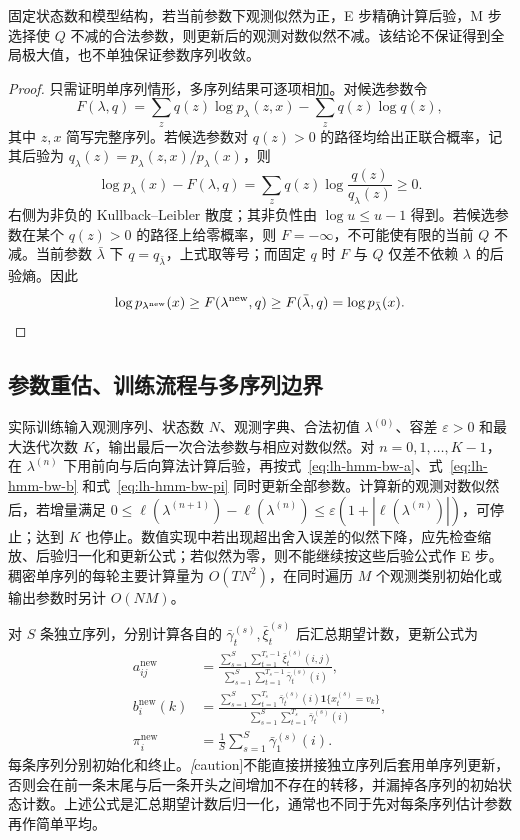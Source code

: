 \begin{proposition}
\label{prop:lh-hmm-em-monotone}
固定状态数和模型结构，若当前参数下观测似然为正，E 步精确计算后验，M 步选择使 $Q$ 不减的合法参数，则更新后的观测对数似然不减。该结论不保证得到全局极大值，也不单独保证参数序列收敛。
\end{proposition}
\begin{proof}
只需证明单序列情形，多序列结果可逐项相加。对候选参数令
\[
 F(\lambda,q)=\sum_z q(z)\log p_\lambda(z,x)-\sum_zq(z)\log q(z),
\]
其中 $z,x$ 简写完整序列。若候选参数对 $q(z)>0$ 的路径均给出正联合概率，记其后验为 $q_\lambda(z)=p_\lambda(z,x)/p_\lambda(x)$，则
\[
 \log p_\lambda(x)-F(\lambda,q)
 =\sum_zq(z)\log\frac{q(z)}{q_\lambda(z)}\geq0.
\]
右侧为非负的 Kullback--Leibler 散度；其非负性由 $\log u\leq u-1$ 得到。若候选参数在某个 $q(z)>0$ 的路径上给零概率，则 $F=-\infty$，不可能使有限的当前 $Q$ 不减。当前参数 $\bar\lambda$ 下 $q=q_{\bar\lambda}$，上式取等号；而固定 $q$ 时 $F$ 与 $Q$ 仅差不依赖 $\lambda$ 的后验熵。因此
\[
 \log p_{\lambda^{\mathrm{new}}}(x)
 \geq F(\lambda^{\mathrm{new}},q)
 \geq F(\bar\lambda,q)
 =\log p_{\bar\lambda}(x).\qedhere
\]
\end{proof}

\subsection{参数重估、训练流程与多序列边界}

实际训练输入观测序列、状态数 $N$、观测字典、合法初值 $\lambda^{(0)}$、容差 $\varepsilon>0$ 和最大迭代次数 $K$，输出最后一次合法参数与相应对数似然。对 $n=0,1,\ldots,K-1$，在 $\lambda^{(n)}$ 下用前向与后向算法计算后验，再按式~\eqref{eq:lh-hmm-bw-a}、式~\eqref{eq:lh-hmm-bw-b} 和式~\eqref{eq:lh-hmm-bw-pi} 同时更新全部参数。计算新的观测对数似然后，若增量满足 $0\leq\ell(\lambda^{(n+1)})-\ell(\lambda^{(n)})\leq\varepsilon(1+|\ell(\lambda^{(n)})|)$，可停止；达到 $K$ 也停止。数值实现中若出现超出舍入误差的似然下降，应先检查缩放、后验归一化和更新公式；若似然为零，则不能继续按这些后验公式作 E 步。稠密单序列的每轮主要计算量为 $O(TN^2)$，在同时遍历 $M$ 个观测类别初始化或输出参数时另计 $O(NM)$。

对 $S$ 条独立序列，分别计算各自的 $\bar\gamma_t^{(s)},\bar\xi_t^{(s)}$ 后汇总期望计数，更新公式为
\begin{equation}
\label{eq:lh-hmm-bw-multiple}
 \begin{aligned}
 a_{ij}^{\mathrm{new}}
 &=\frac{\sum_{s=1}^S\sum_{t=1}^{T_s-1}\bar\xi_t^{(s)}(i,j)}
 {\sum_{s=1}^S\sum_{t=1}^{T_s-1}\bar\gamma_t^{(s)}(i)},\\
 b_i^{\mathrm{new}}(k)
 &=\frac{\sum_{s=1}^S\sum_{t=1}^{T_s}\bar\gamma_t^{(s)}(i)\mathbf1\{x_t^{(s)}=v_k\}}
 {\sum_{s=1}^S\sum_{t=1}^{T_s}\bar\gamma_t^{(s)}(i)},\\
 \pi_i^{\mathrm{new}}&=\frac1S\sum_{s=1}^S\bar\gamma_1^{(s)}(i).
 \end{aligned}
\end{equation}
每条序列分别初始化和终止。\emph[caution]{不能直接拼接独立序列}后套用单序列更新，否则会在前一条末尾与后一条开头之间增加不存在的转移，并漏掉各序列的初始状态计数。上述公式是汇总期望计数后归一化，通常也不同于先对每条序列估计参数再作简单平均。

